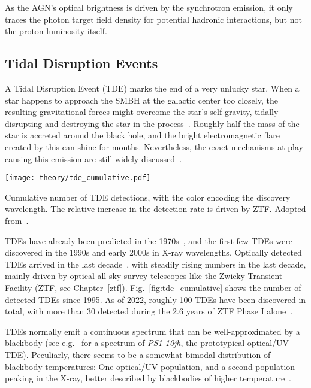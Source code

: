 As the AGN's optical brightness is driven by the synchrotron emission, it only traces the photon target field density for potential hadronic interactions, but not the proton luminosity itself.

\subsection{Tidal Disruption Events}

A Tidal Disruption Event (TDE) marks the end of a very unlucky star. When a star happens to approach the SMBH at the galactic center too closely, the resulting gravitational forces might overcome the star's self-gravity, tidally disrupting and destroying the star in the process~. Roughly half the mass of the star is accreted around the black hole, and the bright electromagnetic flare created by this can shine for months. Nevertheless, the exact mechanisms at play causing this emission are still widely discussed~.

\begin{marginfigure}
    \texttt{[image: theory/tde\_cumulative.pdf]}
    \caption[TDE detections]{Cumulative number of TDE detections, with the color encoding the discovery wavelength. The relative increase in the detection rate is driven by ZTF\@. Adopted from~\cite{Gezari2021}.}
\end{marginfigure}

TDEs have already been predicted in the 1970s~, and the first few TDEs were discovered in the 1990s and early 2000s in X-ray wavelengths. Optically detected TDEs arrived in the last decade~, with steadily rising numbers in the last decade, mainly driven by optical all-sky survey telescopes like the Zwicky Transient Facility (ZTF, see Chapter~\ref{ztf}). Fig.~\ref{fig:tde_cumulative} shows the number of detected TDEs since 1995. As of 2022, roughly 100 TDEs have been discovered in total, with more than 30 detected during the 2.6 years of ZTF Phase I alone~.

TDEs normally emit a continuous spectrum that can be well-approximated by a blackbody (see e.g.~ for a spectrum of \textit{PS1-10jh}, the prototypical optical/UV TDE). Peculiarly, there seems to be a somewhat bimodal distribution of blackbody temperatures: One optical/UV population, and a second population peaking in the X-ray, better described by blackbodies of higher temperature~\cite{Gezari2021}.

